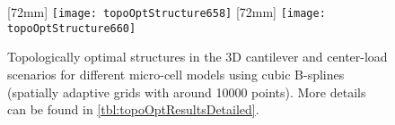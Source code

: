 \begin{figure}
  \newcommand*{\myscale}{0.38}%
  [72mm]{%
    \texttt{[image: topoOptStructure658]}%
  }%
  \hfill%
  [72mm]{%
    \texttt{[image: topoOptStructure660]}%
  }%
  \\[2mm]%
  \hspace*{6mm}
  \caption[Optimal structures in the 3D scenarios]{%
    Topologically optimal structures in the
    3D cantilever and center-load scenarios
    for different micro-cell models using cubic B-splines
    (spatially adaptive grids with around \num{10000} points).
    More details can be found in \cref{tbl:topoOptResultsDetailed}.%
  }%
  \label{fig:topoOptStructure3D}%
\end{figure}

